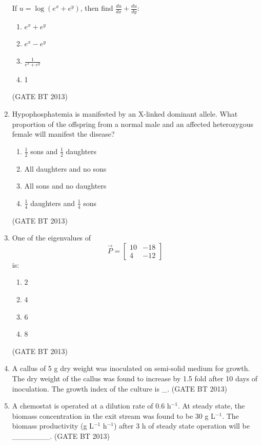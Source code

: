 \documentclass[journal,12pt,onecolumn]{IEEEtran}
\theoremstyle{remark}
\begin{document}
\begin{enumerate}
If \( u = \log \left( e^{x} + e^{y} \right) \), then find \( \frac{du}{dx} + \frac{du}{dy} \):

\begin{enumerate}
    \item $e^{x} + e^{y}$
    \item $e^{x} - e^{y}$
    \item\( \frac{1}{e^x + e^y} \)
    \item 1
\end{enumerate} 
\hfill (GATE BT 2013)
\item 

Hypophosphatemia is manifested by an X-linked dominant allele. What proportion of the offspring from a normal male and an affected heterozygous female will manifest the disease?

\begin{enumerate}
    \item $\frac{1}{2}$ sons and $\frac{1}{2}$ daughters
    \item All daughters and no sons
    \item All sons and no daughters
    \item $\frac{1}{4}$ daughters and $\frac{1}{4}$ sons
\end{enumerate} 
\hfill (GATE BT 2013)
\item 

One of the eigenvalues of 
\[
\vec{P} = \left[
\begin{array}{cc}
10 & -18 \\
4 & -12
\end{array}
\right]
\]
is:

\begin{enumerate}
    \item $2$
    \item $4$
    \item $6$
    \item $8$
\end{enumerate} 
\hfill (GATE BT 2013)
\item 

A callus of 5 g dry weight was inoculated on semi-solid medium for growth. The dry weight of the callus was found to increase by 1.5 fold after 10 days of inoculation. The growth index of the culture is \_.
\hfill (GATE BT 2013)
\item 

A chemostat is operated at a dilution rate of 0.6 h$^{-1}$. At steady state, the biomass concentration in the exit stream was found to be 30 g L$^{-1}$. The biomass productivity (g L$^{-1}$ h$^{-1}$) after 3 h of steady state operation will be \_\_\_\_\_\_\_.
\hfill (GATE BT 2013)


\end{enumerate}
\end{document}
